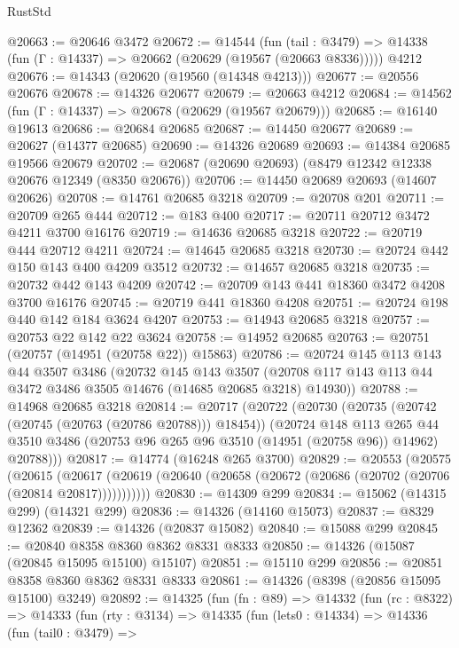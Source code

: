\begin{lexlean}{RustStd}
\begin{coremodule}
@20663 := @20646 @3472
@20672 := @14544
    (fun (tail : @3479) => @14338 (fun (Γ : @14337) => @20662 (@20629 (@19567 (@20663 @8336)))))
    @4212
@20676 := @14343 (@20620 (@19560 (@14348 @4213)))
@20677 := @20556 @20676
@20678 := @14326 @20677
@20679 := @20663 @4212
@20684 := @14562 (fun (Γ : @14337) => @20678 (@20629 (@19567 @20679)))
@20685 := @16140 @19613
@20686 := @20684 @20685
@20687 := @14450 @20677
@20689 := @20627 (@14377 @20685)
@20690 := @14326 @20689
@20693 := @14384 @20685 @19566 @20679
@20702 := @20687 (@20690 @20693) (@8479 @12342 @12338 @20676 @12349 (@8350 @20676))
@20706 := @14450 @20689 @20693 (@14607 @20626)
@20708 := @14761 @20685 @3218
@20709 := @20708 @201
@20711 := @20709 @265 @444
@20712 := @183 @400
@20717 := @20711 @20712 @3472 @4211 @3700 @16176
@20719 := @14636 @20685 @3218
@20722 := @20719 @444 @20712 @4211
@20724 := @14645 @20685 @3218
@20730 := @20724 @442 @150 @143 @400 @4209 @3512
@20732 := @14657 @20685 @3218
@20735 := @20732 @442 @143 @4209
@20742 := @20709 @143 @441 @18360 @3472 @4208 @3700 @16176
@20745 := @20719 @441 @18360 @4208
@20751 := @20724 @198 @440 @142 @184 @3624 @4207
@20753 := @14943 @20685 @3218
@20757 := @20753 @22 @142 @22 @3624
@20758 := @14952 @20685
@20763 := @20751 (@20757 (@14951 (@20758 @22)) @15863)
@20786 := @20724
    @145
    @113
    @143
    @44
    @3507
    @3486
    (@20732
      @145
      @143
      @3507
      (@20708 @117 @143 @113 @44 @3472 @3486 @3505 @14676 (@14685 @20685 @3218) @14930))
@20788 := @14968 @20685 @3218
@20814 := @20717
    (@20722
      (@20730
        (@20735 (@20742 (@20745 (@20763 (@20786 @20788))) @18454))
        (@20724
          @148
          @113
          @265
          @44
          @3510
          @3486
          (@20753 @96 @265 @96 @3510 (@14951 (@20758 @96)) @14962)
          @20788)))
@20817 := @14774 (@16248 @265 @3700)
@20829 := @20553
    (@20575
      (@20615
        (@20617 (@20619 (@20640 (@20658 (@20672 (@20686 (@20702 (@20706 (@20814 @20817)))))))))))
@20830 := @14309 @299
@20834 := @15062 (@14315 @299) (@14321 @299)
@20836 := @14326 (@14160 @15073)
@20837 := @8329 @12362
@20839 := @14326 (@20837 @15082)
@20840 := @15088 @299
@20845 := @20840 @8358 @8360 @8362 @8331 @8333
@20850 := @14326 (@15087 (@20845 @15095 @15100) @15107)
@20851 := @15110 @299
@20856 := @20851 @8358 @8360 @8362 @8331 @8333
@20861 := @14326 (@8398 (@20856 @15095 @15100) @3249)
@20892 := @14325
    (fun (fn : @89) =>
    @14332
      (fun (rc : @8322) =>
      @14333
        (fun (rty : @3134) =>
        @14335
          (fun (lets0 : @14334) =>
          @14336
            (fun (tail0 : @3479) =>

\end{coremodule}
\end{lexlean}
